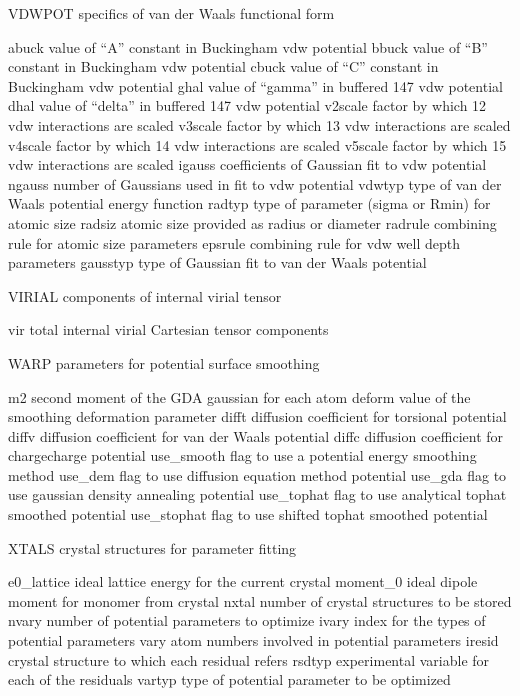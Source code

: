 \documentclass[letterpaper,11pt,english]{sphinxmanual}
\begin{document}
VDWPOT  specifics of van der Waals functional form

abuck   value of “A” constant in Buckingham vdw potential
bbuck   value of “B” constant in Buckingham vdw potential
cbuck   value of “C” constant in Buckingham vdw potential
ghal    value of “gamma” in buffered 14\sphinxhyphen{}7 vdw potential
dhal    value of “delta” in buffered 14\sphinxhyphen{}7 vdw potential
v2scale factor by which 1\sphinxhyphen{}2 vdw interactions are scaled
v3scale factor by which 1\sphinxhyphen{}3 vdw interactions are scaled
v4scale factor by which 1\sphinxhyphen{}4 vdw interactions are scaled
v5scale factor by which 1\sphinxhyphen{}5 vdw interactions are scaled
igauss  coefficients of Gaussian fit to vdw potential
ngauss  number of Gaussians used in fit to vdw potential
vdwtyp  type of van der Waals potential energy function
radtyp  type of parameter (sigma or R\sphinxhyphen{}min) for atomic size
radsiz  atomic size provided as radius or diameter
radrule combining rule for atomic size parameters
epsrule combining rule for vdw well depth parameters
gausstyp        type of Gaussian fit to van der Waals potential

VIRIAL  components of internal virial tensor

vir     total internal virial Cartesian tensor components

WARP    parameters for potential surface smoothing

m2      second moment of the GDA gaussian for each atom
deform  value of the smoothing deformation parameter
difft   diffusion coefficient for torsional potential
diffv   diffusion coefficient for van der Waals potential
diffc   diffusion coefficient for charge\sphinxhyphen{}charge potential
use\_smooth      flag to use a potential energy smoothing method
use\_dem flag to use diffusion equation method potential
use\_gda flag to use gaussian density annealing potential
use\_tophat      flag to use analytical tophat smoothed potential
use\_stophat     flag to use shifted tophat smoothed potential

XTALS   crystal structures for parameter fitting

e0\_lattice      ideal lattice energy for the current crystal
moment\_0        ideal dipole moment for monomer from crystal
nxtal   number of crystal structures to be stored
nvary   number of potential parameters to optimize
ivary   index for the types of potential parameters
vary    atom numbers involved in potential parameters
iresid  crystal structure to which each residual refers
rsdtyp  experimental variable for each of the residuals
vartyp  type of potential parameter to be optimized
\end{document}

